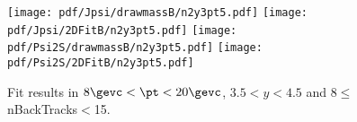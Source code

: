 \begin{figure}[H]
\begin{center}
\texttt{[image: pdf/Jpsi/drawmassB/n2y3pt5.pdf]}
\texttt{[image: pdf/Jpsi/2DFitB/n2y3pt5.pdf]}
\vspace*{-0.5cm}
\texttt{[image: pdf/Psi2S/drawmassB/n2y3pt5.pdf]}
\texttt{[image: pdf/Psi2S/2DFitB/n2y3pt5.pdf]}
\vspace*{-0.5cm}
\end{center}
\caption{Fit results in $8\gevc<\pt<20\gevc$, $3.5<y<4.5$ and 8$\leq$nBackTracks$<$15.}
\label{Fitn2y3pt5}
\end{figure}
